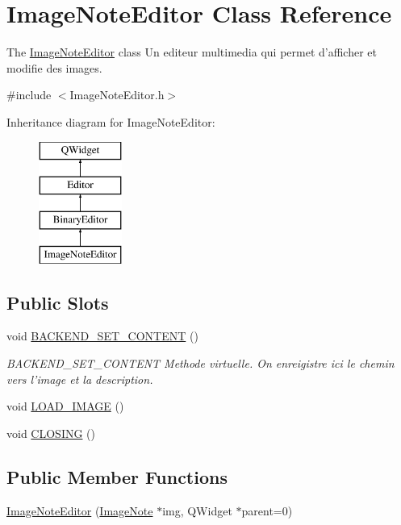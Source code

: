 \hypertarget{class_image_note_editor}{\section{Image\-Note\-Editor Class Reference}
\label{class_image_note_editor}
}


The \hyperlink{class_image_note_editor}{Image\-Note\-Editor} class Un editeur multimedia qui permet d'afficher et modifie des images.  




{\ttfamily \#include $<$Image\-Note\-Editor.\-h$>$}

Inheritance diagram for Image\-Note\-Editor\-:\begin{figure}[H]
\begin{center}
\leavevmode
\includegraphics[height=4.000000cm]{class_image_note_editor}
\end{center}
\end{figure}
\subsection*{Public Slots}
\begin{DoxyCompactItemize}
\item 
void \hyperlink{class_image_note_editor_a68107899833254c56755129e8347a9b3}{B\-A\-C\-K\-E\-N\-D\-\_\-\-S\-E\-T\-\_\-\-C\-O\-N\-T\-E\-N\-T} ()
\begin{DoxyCompactList}\small\item\em B\-A\-C\-K\-E\-N\-D\-\_\-\-S\-E\-T\-\_\-\-C\-O\-N\-T\-E\-N\-T Methode virtuelle. On enreigistre ici le chemin vers l'image et la description. \end{DoxyCompactList}\item 
void \hyperlink{class_image_note_editor_abbdb0b58bd8911b7b0ac8cd2b27ad7f4}{L\-O\-A\-D\-\_\-\-I\-M\-A\-G\-E} ()
\item 
void \hyperlink{class_image_note_editor_a97a44ca38b37101ce535b1723fe0cb4c}{C\-L\-O\-S\-I\-N\-G} ()
\end{DoxyCompactItemize}
\subsection*{Public Member Functions}
\begin{DoxyCompactItemize}
\item 
\hyperlink{class_image_note_editor_a98aa3030dff7f8873819d726c524f6b6}{Image\-Note\-Editor} (\hyperlink{class_image_note}{Image\-Note} $\ast$img, Q\-Widget $\ast$parent=0)
\end{DoxyCompactItemize}
